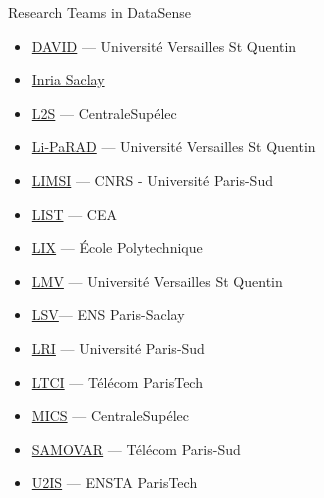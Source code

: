 \begin{frame}{Research Teams in DataSense}

\begin{itemize}
\item \href{http://.david.uvsq.fr/}{DAVID} --- Universit\'e Versailles St Quentin
\item \href{http://www.inria.fr/centre/saclay}{Inria Saclay}
\item \href{http://www.l2s.centralesupelec.fr/}{L2S} --- CentraleSup\'elec
\item \href{http://www.uvsq.fr/laboratoire-d-informatique-parallelisme-reseaux-algorithmes-distribues-li-parad}{Li-PaRAD} --- Universit\'e Versailles St Quentin
\item \href{https://www.limsi.fr/fr/}{LIMSI} --- CNRS - Universit\'e Paris-Sud
\item \href{http://www-list.cea.fr/}{LIST} --- CEA
\item \href{http://www.lix.polytechnique.fr/}{LIX} --- \'Ecole Polytechnique
\item \href{http://lmv.math.cnrs.fr/}{LMV} --- Universit\'e Versailles St Quentin
\item \href{http://www.lsv.ens-cachan.fr/}{LSV}--- ENS Paris-Saclay
\item \href{http://www.lri.fr/}{LRI} --- Universit\'e Paris-Sud
\item \href{https://www.ltci.telecom-paristech.fr/}{LTCI} --- T\'el\'ecom ParisTech
\item \href{http://www.mics.ecp.fr/}{MICS} ---  CentraleSup\'elec
\item \href{http://www.samovar.telecom-sudparis.eu/}{SAMOVAR}  --- T\'el\'ecom Paris-Sud
\item \href{http://u2is.ensta-paristech.fr/}{U2IS} --- ENSTA ParisTech
\end{itemize}
\end{frame}

